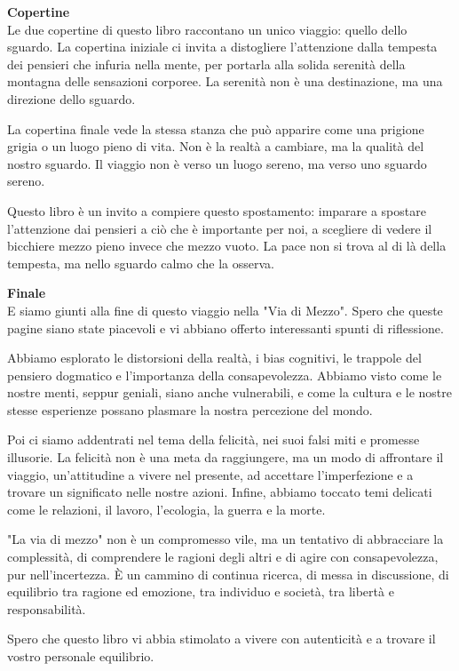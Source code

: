\documentclass[12pt]{book} %
\begin{document}
\noindent \textbf{\large Copertine} \\

Le due copertine di questo libro raccontano un unico viaggio: quello dello sguardo.
La copertina iniziale ci invita a distogliere l'attenzione dalla tempesta dei pensieri che infuria nella mente, per portarla alla solida serenità della montagna delle sensazioni corporee.
La serenità non è una destinazione, ma una direzione dello sguardo.

La copertina finale vede la stessa stanza che può apparire come una prigione grigia o un luogo pieno di vita. Non è la realtà a cambiare, ma la qualità del nostro sguardo.
Il viaggio non è verso un luogo sereno, ma verso uno sguardo sereno.

Questo libro è un invito a compiere questo spostamento: imparare a spostare l'attenzione dai pensieri a ciò che è importante per noi, a scegliere di vedere il bicchiere mezzo pieno invece che mezzo vuoto. 
La pace non si trova al di là della tempesta, ma nello sguardo calmo che la osserva.

\noindent \textbf{\large Finale} \\

E siamo giunti alla fine di questo viaggio nella "Via di Mezzo". Spero che queste pagine siano state piacevoli e vi abbiano offerto interessanti spunti di riflessione.

Abbiamo esplorato le distorsioni della realtà, i bias cognitivi, le trappole del pensiero dogmatico e l'importanza della consapevolezza. Abbiamo visto come le nostre menti, seppur geniali, siano anche vulnerabili, e come la cultura e le nostre stesse esperienze possano plasmare la nostra percezione del mondo.

Poi ci siamo addentrati nel tema della felicità, nei suoi falsi miti e promesse illusorie. La felicità non è una meta da raggiungere, ma un modo di affrontare il viaggio, un'attitudine a vivere nel presente, ad accettare l'imperfezione e a trovare un significato nelle nostre azioni.
Infine, abbiamo toccato temi delicati come le relazioni, il lavoro, l'ecologia, la guerra e la morte.

"La via di mezzo" non è un compromesso vile, ma un tentativo di abbracciare la complessità, di comprendere le ragioni degli altri e di agire con consapevolezza, pur nell'incertezza. È un cammino di continua ricerca, di messa in discussione, di equilibrio tra ragione ed emozione, tra individuo e società, tra libertà e responsabilità.

Spero che questo libro vi abbia stimolato a vivere con autenticità e a trovare il vostro personale equilibrio.
\end{document}
